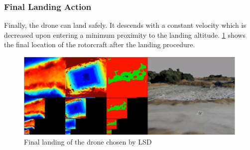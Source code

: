 \subsubsection{Final Landing Action}

Finally, the drone can land safely. It descends with a constant velocity which is decreased upon entering a minimum proximity to the landing altitude.
\cref{fig:demo_final_landing} shows the final location of the rotorcraft after the landing procedure.

\begin{figure}[h]
\centering
\includegraphics[scale=0.25]{images/autonomous_landing/demo_flight/landed.png}
\caption{Final landing of the drone chosen by LSD}
\label{fig:demo_final_landing}
\end{figure}








